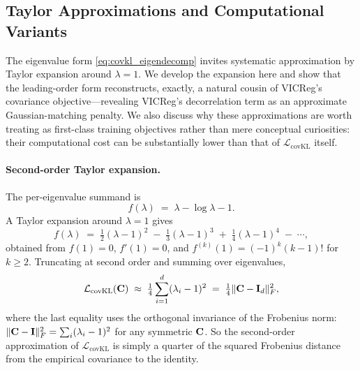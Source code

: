 \subsection{Taylor Approximations and Computational Variants}
\label{sec:taylor_variants}

The eigenvalue form \eqref{eq:covkl_eigendecomp} invites systematic approximation by Taylor expansion around $\lambda = 1$. We develop the expansion here and show that the leading-order form reconstructs, exactly, a natural cousin of VICReg's covariance objective---revealing VICReg's decorrelation term as an approximate Gaussian-matching penalty. We also discuss why these approximations are worth treating as first-class training objectives rather than mere conceptual curiosities: their computational cost can be substantially lower than that of $\mathcal{L}_\text{covKL}$ itself.

\paragraph{Second-order Taylor expansion.}
The per-eigenvalue summand is
\begin{equation}
    f(\lambda) \;=\; \lambda - \log\lambda - 1.
\end{equation}
A Taylor expansion around $\lambda = 1$ gives
\begin{equation}
\label{eq:taylor}
    f(\lambda) \;=\; \tfrac{1}{2}(\lambda - 1)^2 \;-\; \tfrac{1}{3}(\lambda - 1)^3 \;+\; \tfrac{1}{4}(\lambda - 1)^4 \;-\; \cdots,
\end{equation}
obtained from $f(1) = 0$, $f'(1) = 0$, and $f^{(k)}(1) = (-1)^k(k-1)!$ for $k \ge 2$. Truncating at second order and summing over eigenvalues,
\begin{equation}
\label{eq:covkl_f_approx}
    \mathcal{L}_\text{covKL}(\mathbf{C}) \;\approx\; \tfrac{1}{4} \sum_{i=1}^{d} (\lambda_i - 1)^2 \;=\; \tfrac{1}{4} \|\mathbf{C} - \mathbf{I}_d\|_F^2,
\end{equation}
where the last equality uses the orthogonal invariance of the Frobenius norm: $\|\mathbf{C} - \mathbf{I}\|_F^2 = \sum_i (\lambda_i - 1)^2$ for any symmetric $\mathbf{C}$. So the second-order approximation of $\mathcal{L}_\text{covKL}$ is simply a quarter of the squared Frobenius distance from the empirical covariance to the identity.

